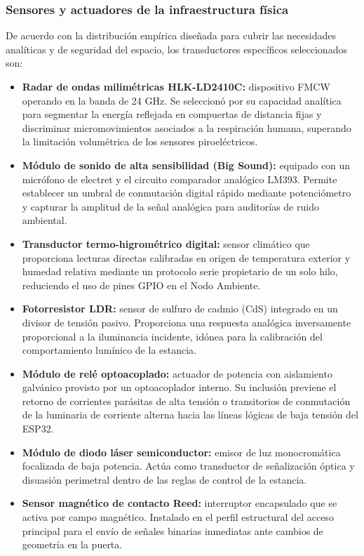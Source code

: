 \subsubsection{Sensores y actuadores de la infraestructura física}
De acuerdo con la distribución empírica diseñada para cubrir las necesidades analíticas y de seguridad del espacio, los transductores específicos seleccionados son:
\begin{itemize}
    \item \textbf{Radar de ondas milimétricas HLK-LD2410C:} dispositivo FMCW operando en la banda de 24 GHz. Se seleccionó por su capacidad analítica para segmentar la energía reflejada en compuertas de distancia fijas y discriminar micromovimientos asociados a la respiración humana, superando la limitación volumétrica de los sensores piroeléctricos.
    \item \textbf{Módulo de sonido de alta sensibilidad (Big Sound):} equipado con un micrófono de electret y el circuito comparador analógico LM393. Permite establecer un umbral de conmutación digital rápido mediante potenciómetro y capturar la amplitud de la señal analógica para auditorías de ruido ambiental.
    \item \textbf{Transductor termo-higrométrico digital:} sensor climático que proporciona lecturas directas calibradas en origen de temperatura exterior y humedad relativa mediante un protocolo serie propietario de un solo hilo, reduciendo el uso de pines GPIO en el Nodo Ambiente.
    \item \textbf{Fotorresistor LDR:} sensor de sulfuro de cadmio (CdS) integrado en un divisor de tensión pasivo. Proporciona una respuesta analógica inversamente proporcional a la iluminancia incidente, idónea para la calibración del comportamiento lumínico de la estancia.
    \item \textbf{Módulo de relé optoacoplado:} actuador de potencia con aislamiento galvánico provisto por un optoacoplador interno. Su inclusión previene el retorno de corrientes parásitas de alta tensión o transitorios de conmutación de la luminaria de corriente alterna hacia las líneas lógicas de baja tensión del ESP32.
    \item \textbf{Módulo de diodo láser semiconductor:} emisor de luz monocromática focalizada de baja potencia. Actúa como transductor de señalización óptica y disuasión perimetral dentro de las reglas de control de la estancia.
    \item \textbf{Sensor magnético de contacto Reed:} interruptor encapsulado que se activa por campo magnético. Instalado en el perfil estructural del acceso principal para el envío de señales binarias inmediatas ante cambios de geometría en la puerta.
\end{itemize}

